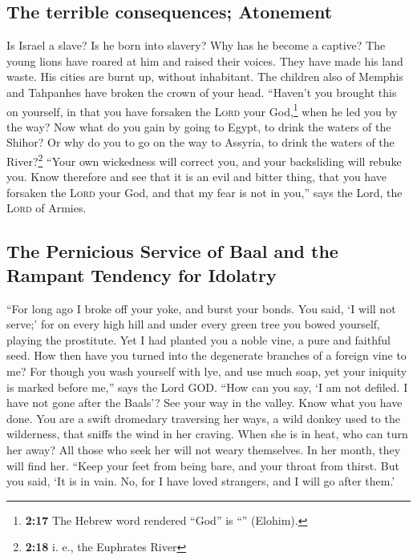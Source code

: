\hypertarget{the-terrible-consequences-atonement}{%
\subsection{The terrible consequences;
Atonement}\label{the-terrible-consequences-atonement}}

 Is Israel a slave? Is he born into slavery? Why has he
become a captive?  The young lions have roared at him and
raised their voices. They have made his land waste. His cities are burnt
up, without inhabitant.  The children also of Memphis and
Tahpanhes have broken the crown of your head.  ``Haven't
you brought this on yourself, in that you have forsaken the
\textsc{Lord} your God,\footnote{\textbf{2:17} The Hebrew word rendered
  ``God'' is ``'' (Elohim).} when he led you by the way?
 Now what do you gain by going to Egypt, to drink the
waters of the Shihor? Or why do you to go on the way to Assyria, to
drink the waters of the River?\footnote{\textbf{2:18} i. e., the
  Euphrates River}  ``Your own wickedness will correct
you, and your backsliding will rebuke you. Know therefore and see that
it is an evil and bitter thing, that you have forsaken the \textsc{Lord}
your God, and that my fear is not in you,'' says the Lord, the
\textsc{Lord} of Armies.

\hypertarget{the-pernicious-service-of-baal-and-the-rampant-tendency-for-idolatry}{%
\subsection{The Pernicious Service of Baal and the Rampant Tendency for
Idolatry}\label{the-pernicious-service-of-baal-and-the-rampant-tendency-for-idolatry}}

 ``For long ago I broke off your yoke, and burst your
bonds. You said, `I will not serve;' for on every high hill and under
every green tree you bowed yourself, playing the prostitute.
 Yet I had planted you a noble vine, a pure and faithful
seed. How then have you turned into the degenerate branches of a foreign
vine to me?  For though you wash yourself with lye, and
use much soap, yet your iniquity is marked before me,'' says the Lord
GOD.  ``How can you say, `I am not defiled. I have not
gone after the Baals'? See your way in the valley. Know what you have
done. You are a swift dromedary traversing her ways,  a
wild donkey used to the wilderness, that sniffs the wind in her craving.
When she is in heat, who can turn her away? All those who seek her will
not weary themselves. In her month, they will find her. 
``Keep your feet from being bare, and your throat from thirst. But you
said, `It is in vain. No, for I have loved strangers, and I will go
after them.'


